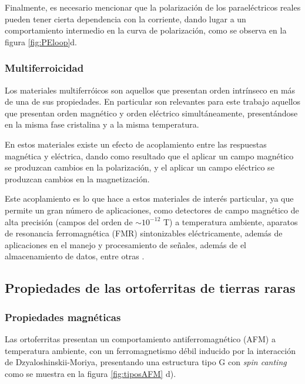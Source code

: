 \documentclass[../main.tex]{subfiles}
\begin{document}
Finalmente, es necesario mencionar que la polarización de los paraeléctricos reales pueden tener cierta dependencia con la corriente, dando lugar a un comportamiento intermedio en la curva de polarización, como se observa en la figura \ref{fig:PEloop}d.
\subsubsection{Multiferroicidad} \label{sec:multif}
Los materiales multiferróicos son aquellos que presentan orden intrínseco en más de una de sus propiedades. En particular son relevantes para este trabajo aquellos que presentan orden magnético y orden eléctrico simultáneamente, presentándose en la misma fase cristalina y a la misma temperatura.

En estos materiales existe un efecto de acoplamiento entre las respuestas magnética y eléctrica, dando como resultado que el aplicar un campo magnético se produzcan cambios en la polarización, y el aplicar un campo eléctrico se produzcan cambios en la magnetización.

Este acoplamiento es lo que hace a estos materiales de interés particular, ya que permite un gran número de aplicaciones, como detectores de campo magnético de alta precisión (campos del orden de $\sim10^{-12}$ T) a temperatura ambiente, aparatos de resonancia ferromagnética (FMR) sintonizables eléctricamente, además de aplicaciones en el manejo y procesamiento de señales, además de el almacenamiento de datos, entre otras \cite{Vopson2015}.
\subsection{Propiedades de las ortoferritas de tierras raras}
\subsubsection{Propiedades magnéticas}
Las ortoferritas  presentan un comportamiento antiferromagnético (AFM) a temperatura ambiente, con un ferromagnetismo débil inducido por la interacción de Dzyaloshinskii-Moriya, presentando una estructura tipo G con \textit{spin canting} como se muestra en la figura \ref{fig:tiposAFM} d).
\end{document}
